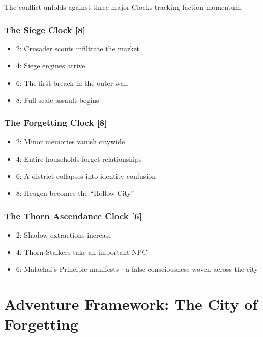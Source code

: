 \documentclass[11pt]{book}
\begin{document}
The conflict unfolds against three major Clocks tracking faction momentum.

\subsubsection*{The Siege Clock [8]}
\begin{itemize}[leftmargin=*]
    \item 2: Crusader scouts infiltrate the market  
    \item 4: Siege engines arrive  
    \item 6: The first breach in the outer wall  
    \item 8: Full-scale assault begins
\end{itemize}

\subsubsection*{The Forgetting Clock [8]}
\begin{itemize}[leftmargin=*]
    \item 2: Minor memories vanish citywide  
    \item 4: Entire households forget relationships  
    \item 6: A district collapses into identity confusion  
    \item 8: Heugen becomes the ``Hollow City''
\end{itemize}

\subsubsection*{The Thorn Ascendance Clock [6]}
\begin{itemize}[leftmargin=*]
    \item 2: Shadow extractions increase  
    \item 4: Thorn Stalkers take an important NPC  
    \item 6: Malachai's Principle manifests---a false consciousness woven across the city
\end{itemize}

\section{Adventure Framework: The City of Forgetting}
\end{document}
